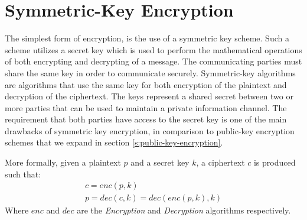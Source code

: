 \section{Symmetric-Key Encryption}\label{s:symmetric-key-encryption}
The simplest form of encryption, is the use of a symmetric key scheme. Such a scheme utilizes a secret key which is used to perform the mathematical operations of both encrypting and decrypting of a message.
The communicating parties must share the same key in order to communicate securely.
Symmetric-key algorithms are algorithms that use the same key for both encryption of the plaintext and decryption of the ciphertext.
The keys represent a shared secret between two or more parties that can be used to maintain a private information channel.
The requirement that both parties have access to the secret key is one of the main drawbacks of symmetric key encryption, in comparison to public-key encryption schemes that we expand in section \ref{s:public-key-encryption}.

More formally, given a plaintext $p$ and a secret key $k$, a ciphertext $c$ is produced such that:
\begin{equation}
  \label{eq:t}
  \begin{aligned}
    c = enc(p, k)\\
    p = dec(c, k) = dec(enc(p, k), k)
  \end{aligned}
  \end{equation}
Where $enc$ and $dec$ are the \textit{Encryption} and \textit{Decryption} algorithms respectively.
